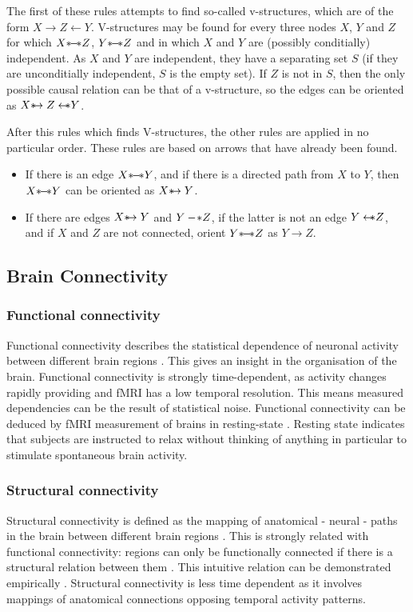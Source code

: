 \documentclass[a4paper, 10pt, english, twocolumn]{article}
\def \srightarrow {\text{\textasteriskcentered}\hspace{-0.62em}\rightarrow}
\def \sleftarrow {\leftarrow\hspace{-0.62em}\text{\textasteriskcentered}}
\def \sleftline {-\hspace{-0.16em}\text{\textasteriskcentered}}
\def \sline {\text{\textasteriskcentered}\hspace{-0.38em}-\hspace{-0.4em}\text{\textasteriskcentered}}
\begin{document}
The first of these rules attempts to find so-called v-structures, which are of the form $X \rightarrow Z \leftarrow Y$.
V-structures may be found for every three nodes $X$, $Y$ and $Z$ for which $X \sline Z$, $Y \sline Z$ and in which $X$ and $Y$ are (possibly conditially) independent.
As $X$ and $Y$ are independent, they have a separating set $S$ (if they are unconditially independent, $S$ is the empty set).
If $Z$ is not in $S$, then the only possible causal relation can be that of a v-structure, so the edges can be oriented as $X \srightarrow Z \sleftarrow Y$.


After this rules which finds V-structures, the other rules are applied in no particular order. These rules are based on arrows that have already been found.
\begin{itemize}
\item If there is an edge $X \sline Y$, and if there is a directed path from $X$ to $Y$, then $X \sline Y$ can be oriented as $X \srightarrow Y$.
\item If there are edges $X \srightarrow Y$ and $Y \sleftline Z$, if the latter is not an edge $Y \sleftarrow Z$, and if $X$ and $Z$ are not connected, orient $Y \sline Z$ as $Y \rightarrow Z$. 
\end{itemize}



\subsection{Brain Connectivity}

\subsubsection*{Functional connectivity}
Functional connectivity describes the statistical dependence of neuronal activity between different brain regions \cite{friston1993functional}.
This gives an insight in the organisation of the brain.
Functional connectivity is strongly time-dependent, as activity changes rapidly providing and fMRI has a low temporal resolution.
This means measured dependencies can be the result of statistical noise.
Functional connectivity can be deduced by fMRI measurement of brains in resting-state \cite{Lowe2000, doria2010, Bullmore2009}.
Resting state indicates that subjects are instructed to relax without thinking of anything in particular to stimulate spontaneous brain activity.

\subsubsection*{Structural connectivity}
Structural connectivity is defined as the mapping of anatomical - neural - paths in the brain between different brain regions \cite{friston1994}.
This is strongly related with functional connectivity: regions can only be functionally connected if there is a structural relation between them \cite{cabral2012}.
This intuitive relation can be demonstrated empirically \cite{vandenheuvel2009}.
Structural connectivity is less time dependent as it involves mappings of anatomical connections opposing temporal activity patterns.
\end{document}
